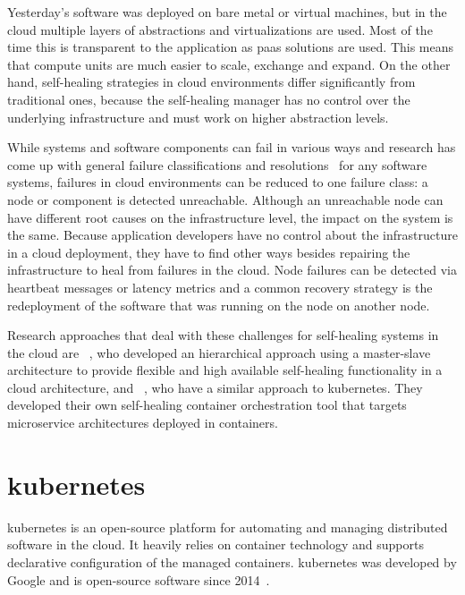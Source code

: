   Yesterday's software was deployed on bare metal or virtual machines, but in the cloud multiple layers of abstractions and virtualizations are used.
  Most of the time this is transparent to the application as \gls{paas} solutions are used.
  This means that compute units are much easier to scale, exchange and expand.
  On the other hand, self-healing strategies in cloud environments differ significantly from traditional ones, because the self-healing manager has no control over the underlying infrastructure and must work on higher abstraction levels.

  While systems and software components can fail in various ways and research has come up with general failure classifications and resolutions~\cite[Tab.~1]{PsaierSurvey} for any software systems, failures in cloud environments can be reduced to one failure class: a node or component is detected unreachable.
  Although an unreachable node can have different root causes on the infrastructure level, the impact on the system is the same.
  Because application developers have no control about the infrastructure in a cloud deployment, they have to find other ways besides repairing the infrastructure to heal from failures in the cloud.
  Node failures can be detected via heartbeat messages or latency metrics and a common recovery strategy is the redeployment of the software that was running on the node on another node.

  Research approaches that deal with these challenges for self-healing systems in the cloud are \citeauthor{StackCloud}~\cite{StackCloud}, who developed an hierarchical approach using a master-slave architecture to provide flexible and high available self-healing functionality in a cloud architecture, and \citeauthor{gru}~\cite{gru}, who have a similar approach to \gls{kubernetes}.
  They developed their own self-healing container orchestration tool that targets microservice architectures deployed in containers.

\section[Kubernetes]{\gls{kubernetes}}\label{sec:kubernetes}
  \Gls{kubernetes} is an open-source platform for automating and managing distributed software in the cloud.
  It heavily relies on container technology and supports declarative configuration of the managed containers.
  \Gls{kubernetes} was developed by Google and is open-source software since 2014~\cite{kubernetes}.

